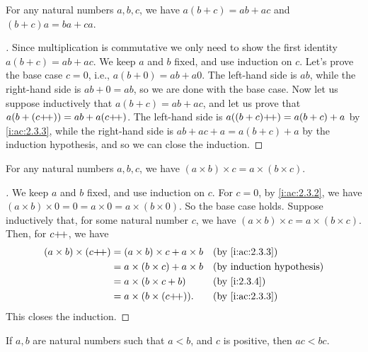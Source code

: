 \begin{prop}\label{i:2.3.4}
  For any natural numbers \(a, b, c\), we have \(a(b + c) = ab + ac\) and \((b + c)a = ba + ca\).
\end{prop}

\begin{proof}[]
  Since multiplication is commutative we only need to show the first identity \(a(b + c) = ab + ac\).
  We keep \(a\) and \(b\) fixed, and use induction on \(c\).
  Let's prove the base case \(c = 0\), i.e., \(a(b + 0) = ab + a0\).
  The left-hand side is \(ab\), while the right-hand side is \(ab + 0 = ab\), so we are done with the base case.
  Now let us suppose inductively that \(a(b + c) = ab + ac\), and let us prove that \(a(b + (c{+}\!{+})) = ab + a(c{+}\!{+})\).
  The left-hand side is \(a((b + c){+}\!{+}) = a(b + c) + a\) by \cref{i:ac:2.3.3}, while the right-hand side is \(ab + ac + a = a(b + c) + a\) by the induction hypothesis, and so we can close the induction.
\end{proof}

\begin{prop}\label{i:2.3.5}
  For any natural numbers \(a, b, c\), we have \((a \times b) \times c = a \times (b \times c)\).
\end{prop}

\begin{proof}[]
  We keep \(a\) and \(b\) fixed, and use induction on \(c\).
  For \(c = 0\), by \cref{i:ac:2.3.2}, we have \((a \times b) \times 0 = 0 = a \times 0 = a \times (b \times 0)\).
  So the base case holds.
  Suppose inductively that, for some natural number \(c\), we have \((a \times b) \times c = a \times (b \times c)\).
  Then, for \(c{+}\!{+}\), we have
  \begin{align*}
    (a \times b) \times (c\pp) & = (a \times b) \times c + a \times b &  & \by{i:ac:2.3.3} \\
                               & = a \times (b \times c) + a \times b &  & \byIH           \\
                               & = a \times (b \times c + b)          &  & \by{i:2.3.4}    \\
                               & = a \times (b \times (c\pp)).        &  & \by{i:ac:2.3.3}
  \end{align*}
  This closes the induction.
\end{proof}

\begin{prop}\label{i:2.3.6}
  If \(a, b\) are natural numbers such that \(a < b\), and \(c\) is positive, then \(ac < bc\).
\end{prop}

